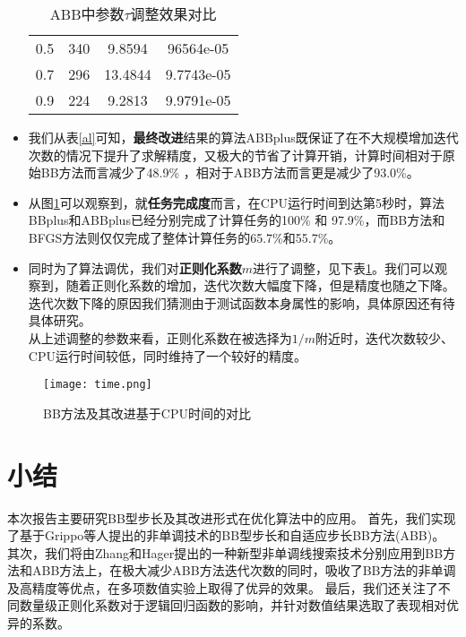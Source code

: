 \begin{itemize}
\begin{table}[thp]
\begin{tabular}{cccc}
		0.5 & 340 &  9.8594 & 96564e-05 \\
		
		0.7 & 296 &  13.4844 &  9.7743e-05\\
		
		0.9 & 224 & 9.2813 &  9.9791e-05\\
		\hline
	\end{tabular}
	\caption{ABB中参数$ \tau $调整效果对比}
	\label{ABBtau}
\end{table}

\item 我们从表\ref{al}可知，\textbf{最终改进}结果的算法ABBplus既保证了在不大规模增加迭代次数的情况下提升了求解精度，又极大的节省了计算开销，计算时间相对于原始BB方法而言减少了48.9\% ，相对于ABB方法而言更是减少了93.0\%。



\item 从图\ref{time}可以观察到，就\textbf{任务完成度}而言，在CPU运行时间到达第5秒时，算法BBplus和ABBplus已经分别完成了计算任务的100\% 和 97.9\%，而BB方法和BFGS方法则仅仅完成了整体计算任务的65.7\%和55.7\%。


\item 同时为了算法调优，我们对\textbf{正则化系数$ m $}进行了调整，见下表\ref{ABBtau}。我们可以观察到，随着正则化系数的增加，迭代次数大幅度下降，但是精度也随之下降。迭代次数下降的原因我们猜测由于测试函数本身属性的影响，具体原因还有待具体研究。\\
从上述调整的参数来看，正则化系数在被选择为$ 1/m $附近时，迭代次数较少、CPU运行时间较低，同时维持了一个较好的精度。
\end{itemize}

\begin{figure}
	\centering
	\texttt{[image: time.png]}
	\caption{BB方法及其改进基于CPU时间的对比}
	\label{time}
\end{figure}


\chapter{\hei 小结}

本次报告主要研究BB型步长及其改进形式在优化算法中的应用。
首先，我们实现了基于Grippo等人提出的非单调技术\cite{grippo1991class}的BB型步长\cite{barzilai1988two}和自适应步长BB方法(ABB)\cite{zhou2006gradient}。
其次，我们将由Zhang和Hager提出的一种新型非单调线搜索技术\cite{zhang2004nonmonotone}分别应用到BB方法和ABB方法上，在极大减少ABB方法迭代次数的同时，吸收了BB方法的非单调及高精度等优点，在多项数值实验上取得了优异的效果。
最后，我们还关注了不同数量级正则化系数对于逻辑回归函数的影响，并针对数值结果选取了表现相对优异的系数。